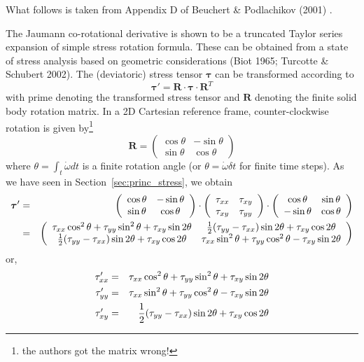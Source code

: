 What follows is taken from Appendix D of Beuchert \& Podlachikov (2001) \cite{bepo10}.

The Jaumann co-rotational derivative is shown to be a truncated Taylor series expansion 
of simple stress rotation formula. These can be
obtained from a state of stress analysis based on geometric 
considerations (Biot 1965; Turcotte \& Schubert 2002). 
The (deviatoric) stress tensor ${\bm \tau}$ can be transformed according to
\[
{\bm \tau}' = {\bm R}\cdot {\bm \tau} \cdot {\bm R}^{T}
\]
with prime denoting the transformed stress tensor and ${\bm R}$ 
denoting the finite solid body rotation matrix. In a 2D Cartesian reference frame,
counter-clockwise rotation is given by\footnote{the authors got the matrix wrong!}
\[
{\bm R} = \left(\begin{array}{cc} \cos\theta & -\sin\theta \\ \sin\theta & \cos\theta  \end{array}\right)
\]
where $\theta = \int_t \dot{\omega} dt$ is a finite rotation angle (or $\theta=\dot{\omega} \delta t$ 
for finite time steps).
As we have seen in Section~\ref{sec:princ_stress}, we obtain 
\begin{eqnarray}
{\bm \tau}' 
&=& \left(
\begin{array}{cc}
\cos\theta & -\sin\theta \\
\sin\theta & \cos\theta
\end{array}
\right)
\cdot
\left(
\begin{array}{cc}
\tau_{xx} & \tau_{xy} \\
\tau_{xy} & \tau_{yy} 
\end{array}
\right)
\cdot
\left(
\begin{array}{cc}
\cos\theta & \sin\theta \\
-\sin\theta & \cos\theta
\end{array}
\right) \nonumber\\
&=&
\left(
\begin{array}{cc}
\tau_{xx} \cos^2\theta + \tau_{yy} \sin^2 \theta + \tau_{xy}\sin2\theta &
\frac{1}{2}(\tau_{yy}-\tau_{xx})\sin2\theta + \tau_{xy} \cos2\theta \\
\frac{1}{2}(\tau_{yy}-\tau_{xx})\sin2\theta + \tau_{xy} \cos2\theta &
\tau_{xx} \sin^2\theta + \tau_{yy} \cos^2 \theta - \tau_{xy}\sin2\theta 
\end{array}
\right)
\end{eqnarray}
or, 
\begin{eqnarray}
\tau_{xx}' &=&  \tau_{xx} \cos^2\theta + \tau_{yy} \sin^2 \theta + \tau_{xy}\sin2\theta \nonumber\\
\tau_{yy}' &=&  \tau_{xx} \sin^2\theta + \tau_{yy} \cos^2 \theta - \tau_{xy}\sin2\theta \nonumber\\
\tau_{xy}' &=&  \frac{1}{2}(\tau_{yy}-\tau_{xx})\sin2\theta + \tau_{xy} \cos2\theta \nonumber
\end{eqnarray}
